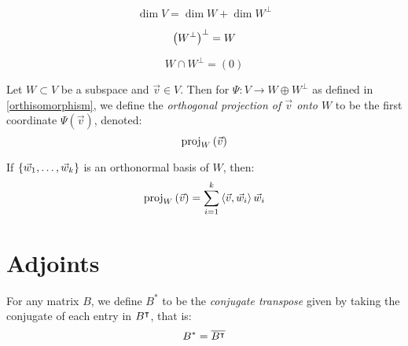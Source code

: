 \begin{corollary}
  $$\dim V = \dim W + \dim W^\perp$$
\end{corollary}

\begin{corollary}
  $$\paren{W^\perp}^\perp = W$$
\end{corollary}

\begin{corollary}
  $$W \cap W^\perp = (0)$$
\end{corollary}

\begin{definition}
  Let $W \subset V$ be a subspace and $\vec v \in V$. Then for $\Psi : V \to W \oplus W^\perp$ as defined in \ref{orthisomorphism},
  we define the \emph{orthogonal projection of $\vec v$ onto $W$} to be the first coordinate $\Psi(\vec v)$, denoted:
    $$\proj[W]{\vec v}$$
\end{definition}

\begin{remark}
  If $\setof{\vec w_1, \ldots, \vec w_k}$ is an orthonormal basis of $W$, then:
    $$\proj[W]{\vec v} = \sum_{i=1}^k \inp{\vec v}{\vec w_i} \vec w_i$$
\end{remark}

\section{Adjoints}

\begin{definition}
  For any matrix $B$, we define $B^*$ to be the \emph{conjugate transpose} given by taking the conjugate of each entry in $\transpose{B}$, that is:
    $$B^* = \conj{\transpose{B}}$$
\end{definition}

